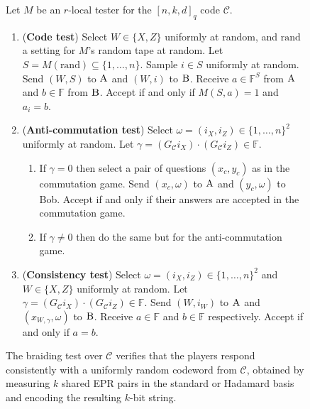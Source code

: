 \documentclass[11pt]{article}
\theoremstyle{definition}
\newcommand{\code}{\mathcal{C}}
\newcommand{\field}{\mathbb{F}}
\newcommand{\rand}{\textrm{rand}}
\newcommand{\labelstyle}[1]{\ensuremath{\textsc{#1}}\xspace}
\newcommand{\alice}{\labelstyle{A}}
\newcommand{\bob}{\labelstyle{B}}
\newenvironment{gamespec}{
  \begin{mdframed}[style=figstyle]}{
  \end{mdframed}}
\begin{document}
\begin{figure}[!htbp]
  \centering
  \begin{gamespec}
Let $M$ be an $r$-local tester for the $[n,k,d]_q$ code $\code$. 
    \begin{enumerate}
      \setlength\itemsep{1pt}
    \item (\textbf{Code test}) Select $W\in \{X,Z\}$ uniformly at random, and $\rand$ a setting for $M$'s random tape at random. Let $S=M(\rand)\subseteq\{1,\ldots,n\}$. Sample $i\in S$ uniformly at random. Send $(W,S)$ to $\alice$ and $(W,i)$ to $\bob$. Receive $a\in \field^S$ from $\alice$ and $b\in \field$ from $\bob$. Accept if and only if $M(S,a)=1$ and $a_i = b$.  
    \item (\textbf{Anti-commutation test}) Select $\omega=(i_X,i_Z)\in \{1,\ldots,n\}^2 $ uniformly at random. Let $\gamma =  (G_\code i_X) \cdot(G_\code {i_Z}) \in \field$.
		\begin{enumerate}
		\item If $\gamma=0$ then select a pair of questions $(x_c,y_c)$ as in the commutation game. Send $(x_c,\omega)$ to $\alice$ and $(y_c,\omega)$ to Bob. Accept if and only if their answers are accepted in the commutation game. 
		\item If $\gamma\neq 0$ then do the same but for the anti-commutation game. 
		\end{enumerate} 
		 \item (\textbf{Consistency test}) Select $\omega=(i_X,i_Z)\in \{1,\ldots,n\}^2 $ and $W\in \{X,Z\}$ uniformly at random. Let $\gamma = (G_\code i_X) \cdot(G_\code {i_Z}) \in \field$. Send $(W,i_W)$ to $\alice$ and $(x_{W,\gamma},\omega)$ to $\bob$. Receive $a\in \field$ and $b\in \field$ respectively. Accept if and only if $a=b$. 
    \end{enumerate}
  \end{gamespec}
  \caption{The braiding test over $\code$ verifies that the players respond consistently with a uniformly random codeword from $\code$, obtained by measuring $k$ shared EPR pairs in the standard or Hadamard basis and encoding the resulting $k$-bit string.}
  \label{fig:braiding-test}
\end{figure}
\end{document}
